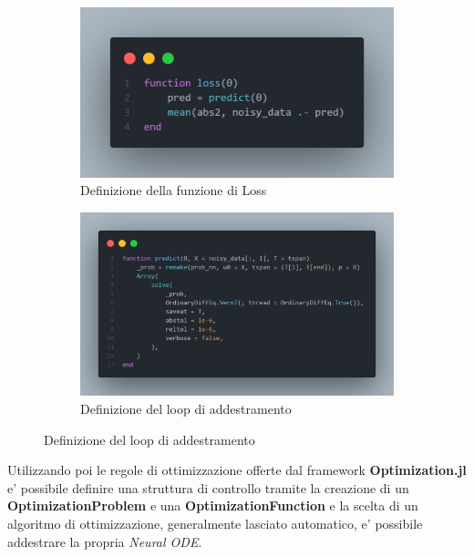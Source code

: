 \begin{figure}[!hb]
	\centering
	\begin{subfigure}[b]{0.45\textwidth}
		\centering
		\includegraphics[width=\textwidth]{img/loss.png}
		\caption{Definizione della funzione di Loss}
		\label{fig:loss_function}
	\end{subfigure}
	\hfill
	\begin{subfigure}[b]{0.45\textwidth}
		\centering
		\includegraphics[width=\textwidth]{img/predict_function.png}
		\caption{Definizione del loop di addestramento}
		\label{fig:predict_function}
	\end{subfigure}
\end{figure}

Utilizzando poi le regole di ottimizzazione offerte dal framework \textbf{Optimization.jl} \cite{vaibhav_kumar_dixit_2023_7738525}
e' possibile definire una struttura di controllo tramite la creazione di un 
\textbf{OptimizationProblem} e una \textbf{OptimizationFunction} e la scelta di un 
algoritmo di ottimizzazione, generalmente lasciato automatico, e' possibile addestrare
la propria \emph{Neural ODE}.

